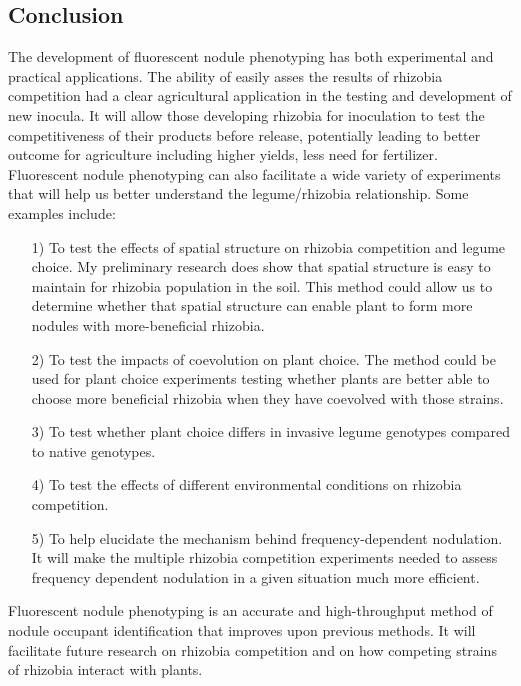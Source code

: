 \documentclass[12pt]{article}
\begin{document}
\begin{doublespace}
	\subsection{Conclusion} 


The development of fluorescent nodule phenotyping has both experimental and practical applications. The ability of easily asses the results of rhizobia competition had a clear agricultural application in the testing and development of new inocula. It will allow those developing rhizobia for inoculation to test the competitiveness of their products before release, potentially leading to better outcome for agriculture including higher yields, less need for fertilizer. Fluorescent nodule phenotyping can also facilitate a wide variety of experiments that will help us better understand the legume/rhizobia relationship. Some examples include:
\begin{itemize}
\item[1)] To test the effects of spatial structure on rhizobia competition and legume choice. My preliminary research does show that spatial structure is easy to maintain for rhizobia population in the soil. This method could allow us to determine whether that spatial structure can enable plant to form more nodules with more-beneficial rhizobia. 
\item[2)] To test the impacts of coevolution on plant choice. The method could be used for plant choice experiments testing whether plants are better able to choose more beneficial rhizobia when they have coevolved with those strains. 
\item[3)] To test whether plant choice differs in invasive legume genotypes compared to native genotypes. 
\item[4)] To test the effects of different environmental conditions on rhizobia competition. 
\item[5)] To help elucidate the mechanism behind frequency-dependent nodulation. It will make the multiple rhizobia competition experiments needed to assess frequency dependent nodulation in a given situation much more efficient.
\end{itemize}
Fluorescent nodule phenotyping is an accurate and high-throughput method of nodule occupant identification that improves upon previous methods. It will facilitate future research on rhizobia competition and on how competing strains of rhizobia interact with plants. 


\end{doublespace}
\end{document}

